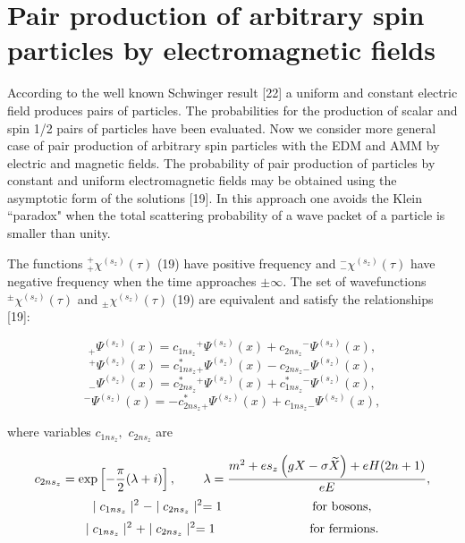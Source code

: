 \documentclass[a4paper,12pt]{article}
\begin{document}
\section{Pair production of arbitrary spin particles by
electromagnetic fields}

According to the well known Schwinger result [22] a uniform and constant
electric field produces pairs of particles. The probabilities for the
production of scalar and spin 1/2 pairs of particles have been evaluated.
Now we consider more general case of pair production of arbitrary spin
particles with the EDM and AMM by electric and magnetic fields. The
probability of pair production of particles by constant and uniform
electromagnetic fields may be obtained using the asymptotic form of the
solutions [19]. In this approach one avoids the Klein ``paradox" when the
total scattering probability of a wave packet of a particle is smaller than
unity.

The functions $_{+}^{+}\chi ^{(s_z)}(\tau )$ (19) have positive frequency
and $_{-}^{-}\chi ^{(s_z)}(\tau )$ have negative frequency when the time
approaches $\pm \infty $. The set of wavefunctions $^{\pm}\chi ^{(s_z)}(\tau
)$ and $_{\pm}\chi ^{(s_z)}(\tau )$ (19) are equivalent and satisfy the
relationships [19]:

\[
_{+}\Psi ^{(s_z)}(x)=c_{1ns_z}{}^{+}\Psi ^{(s_z)}(x)+c_{2ns_z}{}^{-}\Psi
^{(s_x)}(x),
\]
\[
^{+}\Psi ^{(s_z)}(x)=c_{1ns_z}^{*}{}_{+}\Psi ^{(s_z)}(x)-c_{2ns_z}{}_{-}\Psi
^{(s_z)}(x),
\]
\vspace{-8mm}
\begin{equation}  \label{20}
\end{equation}
\vspace{-8mm}
\[
_{-}\Psi ^{(s_z)}(x)=c_{2ns_z}^{*}{}^{+}\Psi
^{(s_z)}(x)+c_{1ns_z}^{*}{}^{-}\Psi ^{(s_z)}(x),
\]
\[
^{-}\Psi ^{(s_z)}(x)=-c_{2ns_z}^{*}{}_{+}\Psi
^{(s_z)}(x)+c_{1ns_z}{}_{-}\Psi ^{(s_z)}(x),
\]

where variables $c_{1ns_z},$ $c_{2ns_z}$ are

\[
c_{2ns_z}=\exp \left[ -\frac \pi 2(\lambda +i)\right] ,\hspace{0.3in}\lambda
=\frac{m^2+es_z\left( gX-\sigma \widetilde{X}\right) +eH(2n+1)}{eE},
\]
\begin{equation}
\mid c_{1ns_z}\mid ^2-\mid c_{2ns_z}\mid
^2=1\hspace{1.0in}\mbox{for~bosons},  \label{21}
\end{equation}
\[
\mid c_{1ns_z}\mid ^2+\mid c_{2ns_z}\mid ^2=1\hspace{1.0in}\mbox{
for~fermions}.
\]
\end{document}
